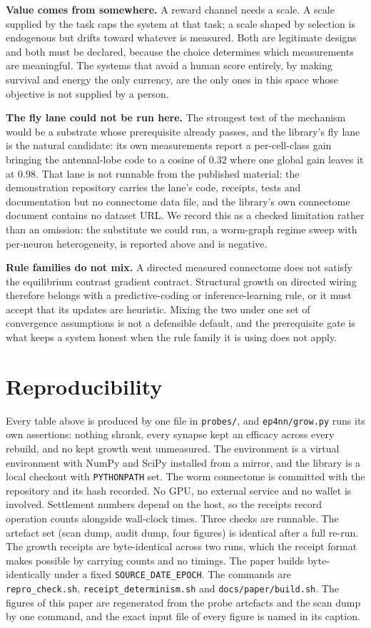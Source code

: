 \documentclass[11pt]{article}
\theoremstyle{remark}
\begin{document}
\textbf{Value comes from somewhere.} A reward channel needs a scale. A scale supplied by the task
caps the system at that task; a scale shaped by selection is endogenous but drifts toward whatever
is measured. Both are legitimate designs and both must be declared, because the choice determines
which measurements are meaningful. The systems that avoid a human score entirely, by making survival
and energy the only currency, are the only ones in this space whose objective is not supplied by a
person.

\textbf{The fly lane could not be run here.} The strongest test of the mechanism would be a
substrate whose prerequisite already passes, and the library's fly lane is the natural candidate: its
own measurements report a per-cell-class gain bringing the antennal-lobe code to a cosine of $0.32$
where one global gain leaves it at $0.98$. That lane is not runnable from the published material: the
demonstration repository carries the lane's code, receipts, tests and documentation but no connectome
data file, and the library's own connectome document contains no dataset URL. We record this as a
checked limitation rather than an omission: the substitute we could run, a worm-graph regime sweep with
per-neuron heterogeneity, is reported above and is negative.

\textbf{Rule families do not mix.} A directed measured connectome does not satisfy the equilibrium
contrast gradient contract. Structural growth on directed wiring therefore belongs with a
predictive-coding or inference-learning rule, or it must accept that its updates are heuristic.
Mixing the two under one set of convergence assumptions is not a defensible default, and the
prerequisite gate is what keeps a system honest when the rule family it is using does not apply.

\section{Reproducibility}

Every table above is produced by one file in \texttt{probes/}, and \texttt{ep4nn/grow.py} runs its
own assertions: nothing shrank, every synapse kept an efficacy across every rebuild, and no kept
growth went unmeasured. The environment is a virtual environment with NumPy and SciPy installed from
a mirror, and the library is a local checkout with \texttt{PYTHONPATH} set. The worm connectome is
committed with the repository and its hash recorded. No GPU, no external service and no wallet is
involved. Settlement numbers depend on the host, so the receipts record operation counts alongside
wall-clock times. Three checks are runnable. The artefact set (scan dump, audit dump, four figures) is
identical after a full re-run. The growth receipts are byte-identical across two runs, which the receipt
format makes possible by carrying counts and no timings. The paper builds byte-identically under a fixed
\texttt{SOURCE\_DATE\_EPOCH}. The commands are \texttt{repro\_check.sh}, \texttt{receipt\_determinism.sh}
and \texttt{docs/paper/build.sh}. The figures of this paper are regenerated from the probe artefacts and the scan
dump by one command, and the exact input file of every figure is named in its caption.
\end{document}
